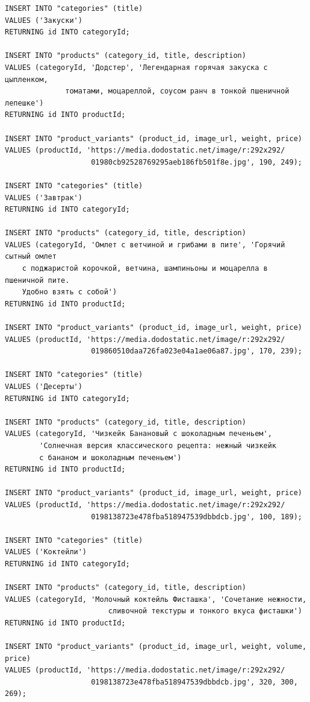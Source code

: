 \documentclass[a4paper,14pt]{extarticle}
\begin{document}
\begin{Verbatim}[tabsize=4,fontsize=\small]
INSERT INTO "categories" (title)
VALUES ('Закуски')
RETURNING id INTO categoryId;

INSERT INTO "products" (category_id, title, description)
VALUES (categoryId, 'Додстер', 'Легендарная горячая закуска с цыпленком, 
              томатами, моцареллой, соусом ранч в тонкой пшеничной лепешке')
RETURNING id INTO productId;

INSERT INTO "product_variants" (product_id, image_url, weight, price)
VALUES (productId, 'https://media.dodostatic.net/image/r:292x292/
                    01980cb92528769295aeb186fb501f8e.jpg', 190, 249);

INSERT INTO "categories" (title)
VALUES ('Завтрак')
RETURNING id INTO categoryId;

INSERT INTO "products" (category_id, title, description)
VALUES (categoryId, 'Омлет с ветчиной и грибами в пите', 'Горячий сытный омлет 
    с поджаристой корочкой, ветчина, шампиньоны и моцарелла в пшеничной пите. 
    Удобно взять с собой')
RETURNING id INTO productId;

INSERT INTO "product_variants" (product_id, image_url, weight, price)
VALUES (productId, 'https://media.dodostatic.net/image/r:292x292/
                    019860510daa726fa023e04a1ae06a87.jpg', 170, 239);

INSERT INTO "categories" (title)
VALUES ('Десерты')
RETURNING id INTO categoryId;

INSERT INTO "products" (category_id, title, description)
VALUES (categoryId, 'Чизкейк Банановый с шоколадным печеньем', 
        'Солнечная версия классического рецепта: нежный чизкейк 
        с бананом и шоколадным печеньем')
RETURNING id INTO productId;

INSERT INTO "product_variants" (product_id, image_url, weight, price)
VALUES (productId, 'https://media.dodostatic.net/image/r:292x292/
                    0198138723e478fba518947539dbbdcb.jpg', 100, 189);

INSERT INTO "categories" (title)
VALUES ('Коктейли')
RETURNING id INTO categoryId;

INSERT INTO "products" (category_id, title, description)
VALUES (categoryId, 'Молочный коктейль Фисташка', 'Сочетание нежности, 
                        сливочной текстуры и тонкого вкуса фисташки')
RETURNING id INTO productId;

INSERT INTO "product_variants" (product_id, image_url, weight, volume, price)
VALUES (productId, 'https://media.dodostatic.net/image/r:292x292/
                    0198138723e478fba518947539dbbdcb.jpg', 320, 300, 269);


\end{Verbatim}
\end{document}
